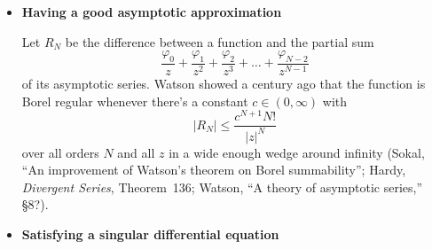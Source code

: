 \documentclass{article}
\begin{document}
\begin{itemize}
\item \textbf{Having a good asymptotic approximation}

Let $R_N$ be the difference between a function and the partial sum
\[ \frac{\varphi_0}{z} + \frac{\varphi_1}{z^2} + \frac{\varphi_2}{z^3} + \ldots + \frac{\varphi_{N-2}}{z^{N-1}} \]
of its asymptotic series. Watson showed a century ago that the function is Borel regular whenever there's a constant $c \in (0, \infty)$ with
\[ |R_N| \le \frac{c^{N+1} N!}{|z|^N} \]
over all orders $N$ and all $z$ in a wide enough wedge around infinity (Sokal, ``An improvement of Watson's theorem on Borel summability''; Hardy, {\em Divergent Series}, Theorem~136; Watson, ``A theory of asymptotic series,'' \S 8?).
\color{black}

\item \textbf{Satisfying a singular differential equation}


\end{itemize}
\end{document}
